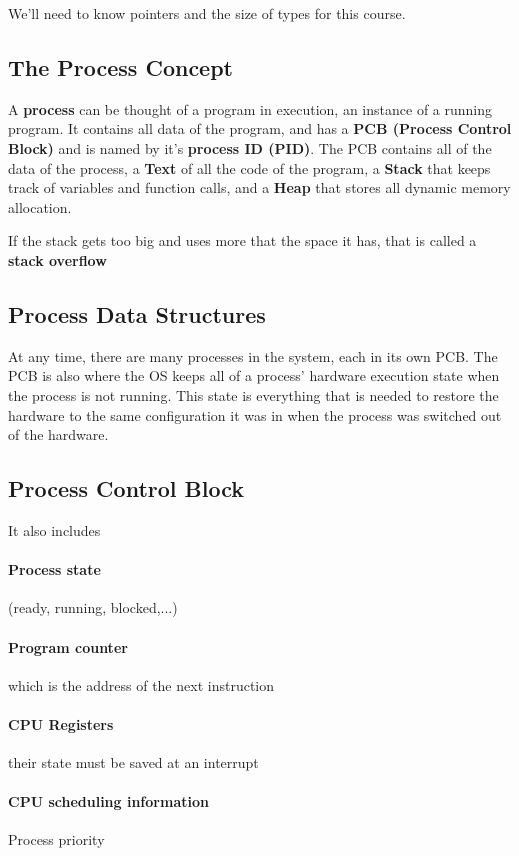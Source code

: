 \documentclass{article}
\begin{document}
We'll need to know pointers and the size of types for this course.

\subsection{The Process Concept}

A \textbf{process} can be thought of a program in execution, an instance of a running program. It contains all data of the program, and has a \textbf{PCB (Process Control Block)} and is named by it's \textbf{process ID (PID)}. The PCB contains all of the data of the process, a \textbf{Text} of all the code of the program, a \textbf{Stack} that keeps track of variables and function calls, and a \textbf{Heap} that stores all dynamic memory allocation.

If the stack gets too big and uses more that the space it has, that is called a \textbf{stack overflow}

\subsection{Process Data Structures}

At any time, there are many processes in the system, each in its own PCB. The PCB is also where the OS keeps all of a process' hardware execution state when the process is not running. This state is everything that is needed to restore the hardware to the same configuration it was in when the process was switched out of the hardware.

\subsection{Process Control Block}

It also includes
\paragraph{Process state} (ready, running, blocked,...)
\paragraph{Program counter} which is the address of the next instruction
\paragraph{CPU Registers} their state must be saved at an interrupt
\paragraph{CPU scheduling information} Process priority
\end{document}

